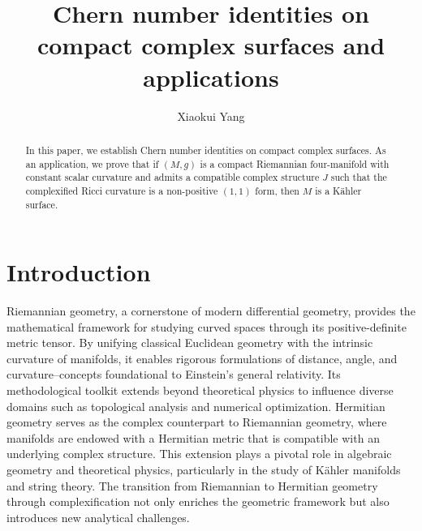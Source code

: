 \documentclass[12pt, reqno]{amsart} \usepackage{pifont} \usepackage{mathrsfs}
\title{Chern number identities on compact complex surfaces and applications}
\author{Xiaokui Yang}
\theoremstyle{plain} \newtheorem{thm}{Theorem}[section]
\theoremstyle{definition} \newtheorem{example}[thm]{Example}
\renewcommand{\>}{\rightarrow}
\numberwithin{equation}{section} %
\begin{document}
	
	\begin{abstract} In this paper, we establish Chern number identities on compact
		complex surfaces. As an application, we prove that  if $(M,g)$ is  a  compact
		Riemannian four-manifold with constant scalar curvature and admits a compatible
		complex structure  $J$ such that the complexified Ricci curvature is a
		non-positive $(1,1)$ form, then $M$ is a K\"ahler surface. \end{abstract}
	
	
	
	\section{Introduction}
	
	
	
	Riemannian geometry, a cornerstone of modern differential geometry, provides
	the mathematical framework for studying curved spaces through its
	positive-definite metric tensor. By unifying classical Euclidean geometry with
	the intrinsic curvature of manifolds, it enables rigorous formulations of
	distance, angle, and curvature--concepts foundational to Einstein's general
	relativity. Its methodological toolkit extends beyond theoretical physics to
	influence diverse domains such as topological analysis and numerical
	optimization. Hermitian geometry serves as the complex counterpart to
	Riemannian geometry, where manifolds are endowed with a Hermitian metric that
	is compatible with an underlying complex structure. This extension plays a
	pivotal role in algebraic geometry and theoretical physics, particularly in the
	study of K\"ahler manifolds and string theory. The transition from Riemannian
	to Hermitian geometry through complexification not only enriches the geometric
	framework but also introduces new analytical challenges.
	
\end{document}
